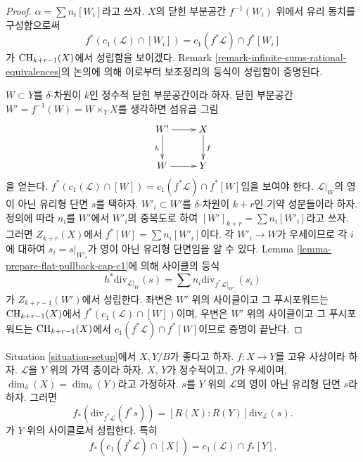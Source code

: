 \begin{proof}
$\alpha = \sum n_i[W_i]$라고 쓰자. $X$의 닫힌 부분공간
$f^{-1}(W_i)$ 위에서 유리 동치를 구성함으로써
$$
f^*(c_1(\mathcal{L}) \cap [W_i]) = c_1(f^*\mathcal{L}) \cap f^*[W_i]
$$
가 $\mathop{\mathrm{CH}}\nolimits_{k + r - 1}(X)$에서 성립함을 보이겠다. Remark
\ref{remark-infinite-sums-rational-equivalences}의 논의에 의해 이로부터
보조정리의 등식이 성립함이 증명된다.

\medskip\noindent
$W \subset Y$를 $\delta$-차원이 $k$인 정수적 닫힌 부분공간이라 하자.
닫힌 부분공간 $W' = f^{-1}(W) = W \times_Y X$를 생각하면 섬유곱 그림
$$
\xymatrix{
W' \ar[r] \ar[d]_h & X \ar[d]^f \\
W \ar[r] & Y
}
$$
을 얻는다.
$f^*(c_1(\mathcal{L}) \cap [W]) = c_1(f^*\mathcal{L}) \cap f^*[W]$임을
보여야 한다. $\mathcal{L}|_W$의 영이 아닌 유리형 단면 $s$를 택하자.
$W'_i \subset W'$를 $\delta$-차원이 $k + r$인 기약 성분들이라 하자.
정의에 따라 $n_i$를 $W'$에서 $W'_i$의 중복도로 하여
$[W']_{k + r} = \sum n_i[W'_i]$라고 쓰자. 그러면
$Z_{k + r}(X)$에서 $f^*[W] = \sum n_i[W'_i]$이다.
각 $W'_i \to W$가 우세이므로 각 $i$에 대하여
$s_i = s|_{W'_i}$가 영이 아닌 유리형 단면임을 알 수 있다.
Lemma \ref{lemma-prepare-flat-pullback-cap-c1}에 의해 사이클의 등식
$$
h^*\text{div}_{\mathcal{L}|_W}(s) =
\sum n_i\text{div}_{f^*\mathcal{L}|_{W'_i}}(s_i)
$$
가 $Z_{k + r - 1}(W')$에서 성립한다. 좌변은 $W'$ 위의 사이클이고
그 푸시포워드는 $\mathop{\mathrm{CH}}\nolimits_{k + r - 1}(X)$에서
$f^*(c_1(\mathcal{L}) \cap [W])$이며, 우변은 $W'$ 위의 사이클이고
그 푸시포워드는 $\mathop{\mathrm{CH}}\nolimits_{k + r - 1}(X)$에서
$c_1(f^*\mathcal{L}) \cap f^*[W]$이므로 증명이 끝난다.
\end{proof}

\begin{lemma}
\label{lemma-equal-c1-as-cycles}
Situation \ref{situation-setup}에서 $X, Y/B$가 좋다고 하자.
$f : X \to Y$를 고유 사상이라 하자.
$\mathcal{L}$을 $Y$ 위의 가역 층이라 하자.
$X$, $Y$가 정수적이고, $f$가 우세이며,
$\dim_\delta(X) = \dim_\delta(Y)$라고 가정하자.
$s$를 $Y$ 위의 $\mathcal{L}$의 영이 아닌 유리형 단면 $s$라 하자.
그러면
$$
f_*\left(\text{div}_{f^*\mathcal{L}}(f^*s)\right) =
[R(X) : R(Y)]\text{div}_\mathcal{L}(s).
$$
가 $Y$ 위의 사이클로서 성립한다. 특히
$$
f_*(c_1(f^*\mathcal{L}) \cap [X]) = c_1(\mathcal{L}) \cap f_*[Y].
$$
\end{lemma}

